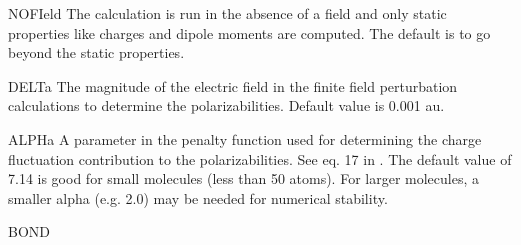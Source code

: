 \begin{keywordlist}
\item[NOFIeld]
The calculation is run in the absence of a field and only static properties
like charges and dipole moments are computed. The default is to go beyond the
static properties.
\item[DELTa]
The magnitude of the electric field in the finite field perturbation
calculations to determine the polarizabilities. Default value is 0.001 au.
\item[ALPHa]
A parameter in the penalty function used for determining the
charge fluctuation contribution to the polarizabilities. See eq. 17 in
\cite{Gagliardi:04a}. The default value of 7.14 is good for small molecules
(less than 50 atoms). For larger molecules, a smaller alpha (e.g. 2.0)
may be needed for numerical stability.
\item[BOND]

\end{keywordlist}
